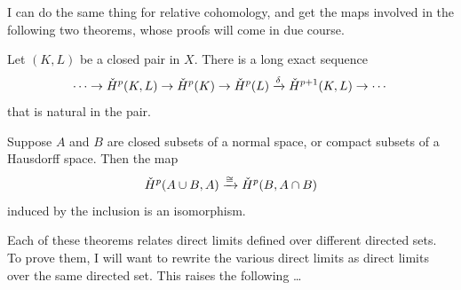 I can do the same thing for relative cohomology, and get the maps
involved in the following two theorems, whose proofs will come in due course.
\begin{theorem}
\label{cech-les}
Let $(K,L)$ be a closed pair in $X$. There is a long exact sequence
\begin{equation*}
\cdots\to\check{H}^p(K,L)\to\check{H}^p(K)\to\check{H}^p(L)\xrightarrow{\delta}\check{H}^{p+1}(K,L)\to\cdots
\end{equation*}
that is natural in the pair. 
\end{theorem}
\begin{theorem}[Excision]
\label{cech-excision}
Suppose $A$ and $B$ are closed subsets of a normal space, 
or compact subsets of a Hausdorff space.  
Then the map
\[
\check{H}^p(A\cup B,A)\xrightarrow{\cong}\check{H}^p(B,A\cap B)
\] 
induced by the inclusion is an isomorphism.
\end{theorem}

Each of these theorems relates direct limits defined over different directed 
sets. To prove them, I will want to rewrite the various direct limits
as direct limits over the same directed set. This raises the following \ldots

